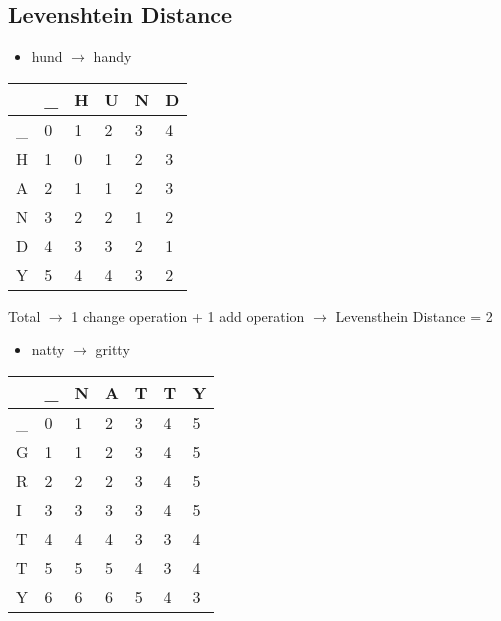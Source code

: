 \documentclass{article}
\begin{document}
	\subsection { Levenshtein Distance }

	\begin{itemize}
	\item hund $\rightarrow$ handy 
	\end{itemize}

	\begin{center}
	\begin{tabular} { | m{1cm} | m{1cm} | m{1cm} | m{1cm} | m{1cm} | m{1cm} | }
		\hline
		 & \_ & H & U & N & D \\
		\hline
		\_ & 0 & 1 & 2 & 3 & 4 \\
		\hline
		H & 1 & 0 & 1 & 2 & 3 \\
		\hline
		A & 2 & 1 & 1 & 2 & 3 \\
		\hline
		N & 3 & 2 & 2 & 1 & 2 \\
		\hline
		D & 4 & 3 & 3 & 2 & 1 \\
		\hline
		Y & 5 & 4 & 4 & 3 & 2  \\
		\hline
	\end{tabular}
	\end{center}
	
	Total $\rightarrow$ 1 change operation + 1 add operation $\rightarrow$ Levensthein Distance = 2

	\begin{itemize}
	\item natty $\rightarrow$ gritty 
	\end{itemize}

	\begin{center}
	\begin{tabular} { | m{1cm} | m{1cm} | m{1cm} | m{1cm} | m{1cm} | m{1cm} | m{1cm} | }
		\hline
		 & \_ & N & A & T & T & Y \\
		\hline
		\_ & 0 & 1 & 2 & 3 & 4 & 5 \\
		\hline
		G & 1 & 1 & 2 & 3 & 4  & 5 \\
		\hline
		R & 2 & 2 & 2 & 3 & 4 & 5 \\
		\hline
		I & 3 & 3 & 3 & 3 & 4 & 5  \\
		\hline
		T & 4 & 4 & 4 & 3 & 3 & 4 \\
		\hline
		T & 5 & 5 & 5 & 4 & 3 & 4  \\
		\hline
		Y & 6 & 6 & 6 & 5 & 4 & 3  \\
		\hline
	\end{tabular}
	\end{center}
\end{document}

